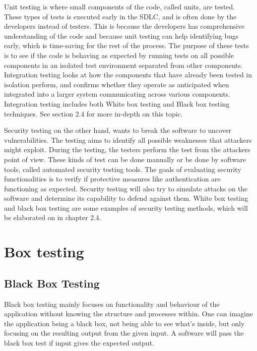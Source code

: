 Unit testing is where small components of the code, called units, are tested. These types of tests is executed early in the SDLC, and is often done by the developers instead of testers. This is because the developers has comprehensive understanding of the code and because unit testing can help identifying bugs early, which is time-saving for the rest of the process. The purpose of these tests is to see if the code is behaving as expected by running tests on all possible components in an isolated test environment separated from other components. Integration testing looks at how the components that have already been tested in isolation perform, and confirms whether they operate as anticipated when integrated into a larger system communicating across various components. Integration testing includes both White box testing and Black box testing techniques. See section 2.4 for more in-depth on this topic.  \cite{unitvsintergration}

Security testing on the other hand, wants to break the software to uncover vulnerabilities. The testing aims to identify all possible weaknesses that attackers might exploit. During the testing, the testers perform the test from the attackers point of view. These kinds of test can be done manually or be done by software tools, called automated security testing tools. The goals of evaluating security functionalities is to verify if protective measures like authentication are functioning as expected. Security testing will also try to simulate attacks on the software and determine its capability to defend against them. White box testing and black box testing are some examples of security testing methods, which will be elaborated on in chapter 2.4.\cite{whysectest}


\section{Box testing}
\subsection{Black Box Testing}
Black box testing mainly focuses on functionality and behaviour of the application without knowing the structure and processes within. One can imagine the application being a black box, not being able to see what's inside, but only focusing on the resulting output from the given input. A software will pass the black box test if input gives the expected output. \cite{blackbox}

